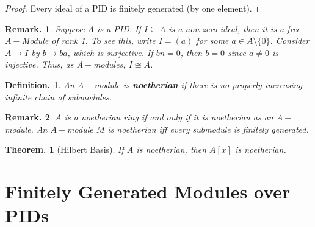 \documentclass[11pt, a4paper]{memoir}
\theoremstyle{change}
\newtheorem{theorem}{Theorem.}[section]
\theoremstyle{plain}
\theoremstyle{nonumberplain}
\newtheorem{definition}{Definition.}
\newtheorem{remark}{Remark.}
\newtheorem{proof}{Proof}
\numberwithin{equation}{section}
\begin{document}
\begin{proof}
    Every ideal of a PID is finitely generated (by one element).
\end{proof}
\begin{remark}
    Suppose $A$ is a PID.
    If $I\subseteq A$ is a non-zero ideal, then it is a free $A-$Module of rank 1.
    To see this, write $I=(a)$ for some $a\in A\setminus\{0\}$.
    Consider $A\to I$ by $b\mapsto ba$, which is surjective.
    If $bn=0$, then $b=0$ since $a\neq 0$ is injective.
    Thus, as $A-$modules, $I\cong A$.
\end{remark}
\begin{definition}
    An $A-$module is \textbf{noetherian} if there is no properly increasing infinite chain of submodules.
\end{definition}
\begin{remark}
    $A$ is a noetherian ring if and only if it is noetherian as an $A-$module.
    An $A-$module $M$ is noetherian iff every submodule is finitely generated.
\end{remark}
\begin{theorem}[Hilbert Basis]
    If $A$ is noetherian, then $A[x]$ is noetherian.
\end{theorem}
\section{Finitely Generated Modules over PIDs}
\end{document}
